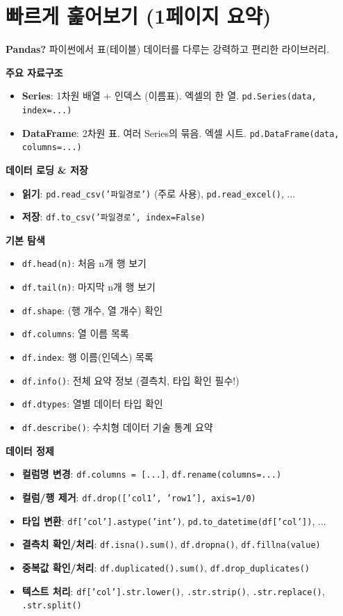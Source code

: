 \documentclass[11pt,a4paper]{book}
\theoremstyle{definition}
\begin{document}
\section{빠르게 훑어보기 (1페이지 요약)}

\begin{tcolorbox}[title={Pandas 핵심 요약}]
\textbf{Pandas?} 파이썬에서 표(테이블) 데이터를 다루는 강력하고 편리한 라이브러리.

\textbf{주요 자료구조}
\begin{itemize}
    \item \textbf{Series}: 1차원 배열 + 인덱스 (이름표). 엑셀의 한 열. \texttt{pd.Series(data, index=...)}
    \item \textbf{DataFrame}: 2차원 표. 여러 Series의 묶음. 엑셀 시트. \texttt{pd.DataFrame(data, columns=...)}
\end{itemize}

\textbf{데이터 로딩 \& 저장}
\begin{itemize}
    \item \textbf{읽기}: \texttt{pd.read\_csv('파일경로')} (주로 사용), \texttt{pd.read\_excel()}, ...
    \item \textbf{저장}: \texttt{df.to\_csv('파일경로', index=False)}
\end{itemize}

\textbf{기본 탐색}
\begin{itemize}
    \item \texttt{df.head(n)}: 처음 n개 행 보기
    \item \texttt{df.tail(n)}: 마지막 n개 행 보기
    \item \texttt{df.shape}: (행 개수, 열 개수) 확인
    \item \texttt{df.columns}: 열 이름 목록
    \item \texttt{df.index}: 행 이름(인덱스) 목록
    \item \texttt{df.info()}: 전체 요약 정보 (결측치, 타입 확인 필수!)
    \item \texttt{df.dtypes}: 열별 데이터 타입 확인
    \item \texttt{df.describe()}: 수치형 데이터 기술 통계 요약
\end{itemize}

\textbf{데이터 정제}
\begin{itemize}
    \item \textbf{컬럼명 변경}: \texttt{df.columns = [...]}, \texttt{df.rename(columns={...})}
    \item \textbf{컬럼/행 제거}: \texttt{df.drop(['col1', 'row1'], axis=1/0)}
    \item \textbf{타입 변환}: \texttt{df['col'].astype('int')}, \texttt{pd.to\_datetime(df['col'])}, ...
    \item \textbf{결측치 확인/처리}: \texttt{df.isna().sum()}, \texttt{df.dropna()}, \texttt{df.fillna(value)}
    \item \textbf{중복값 확인/처리}: \texttt{df.duplicated().sum()}, \texttt{df.drop\_duplicates()}
    \item \textbf{텍스트 처리}: \texttt{df['col'].str.lower()}, \texttt{.str.strip()}, \texttt{.str.replace()}, \texttt{.str.split()}
\end{itemize}


\end{tcolorbox}
\end{document}
